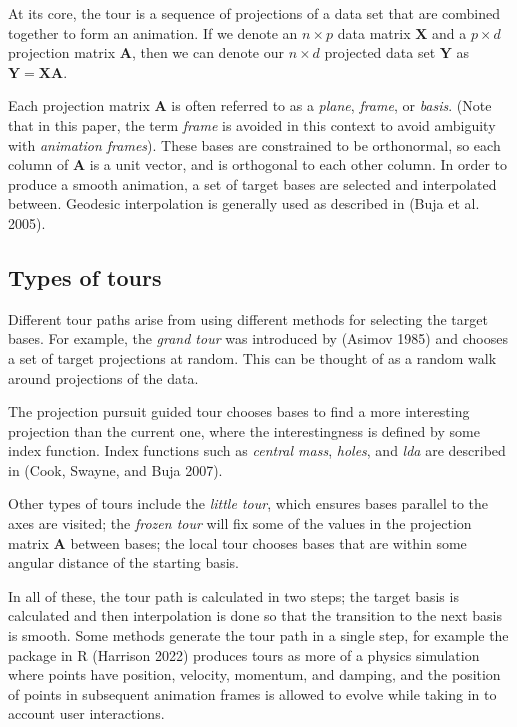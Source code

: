 At its core, the tour is a sequence of projections of a data set that are combined together to form an animation. If we denote an \(n \times p\) data matrix \(\mathbf X\) and a \(p \times d\) projection matrix \(\mathbf A\), then we can denote our \(n \times d\) projected data set \(\mathbf Y\) as \(\mathbf Y = \mathbf X \mathbf A\).

Each projection matrix \(\mathbf A\) is often referred to as a \emph{plane}, \emph{frame}, or \emph{basis}. (Note that in this paper, the term \emph{frame} is avoided in this context to avoid ambiguity with \emph{animation frames}). These bases are constrained to be orthonormal, so each column of \(\mathbf A\) is a unit vector, and is orthogonal to each other column. In order to produce a smooth animation, a set of target bases are selected and interpolated between. Geodesic interpolation is generally used as described in (Buja et al. 2005).

\hypertarget{types-of-tours}{%
\subsection{Types of tours}\label{types-of-tours}}

Different tour paths arise from using different methods for selecting the target bases. For example, the \emph{grand tour} was introduced by (Asimov 1985) and chooses a set of target projections at random. This can be thought of as a random walk around projections of the data.

The projection pursuit guided tour chooses bases to find a more interesting projection than the current one, where the interestingness is defined by some index function. Index functions such as \emph{central mass}, \emph{holes}, and \emph{lda} are described in (Cook, Swayne, and Buja 2007).

Other types of tours include the \emph{little tour}, which ensures bases parallel to the axes are visited; the \emph{frozen tour} will fix some of the values in the projection matrix \(\mathbf A\) between bases; the local tour chooses bases that are within some angular distance of the starting basis.

In all of these, the tour path is calculated in two steps; the target basis is calculated and then interpolation is done so that the transition to the next basis is smooth. Some methods generate the tour path in a single step, for example the  package in R (Harrison 2022) produces tours as more of a physics simulation where points have position, velocity, momentum, and damping, and the position of points in subsequent animation frames is allowed to evolve while taking in to account user interactions.

